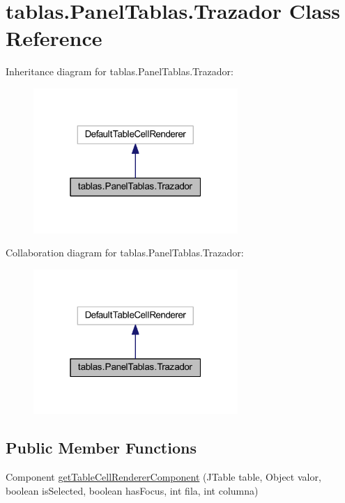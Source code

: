 \hypertarget{classtablas_1_1_panel_tablas_1_1_trazador}{}\section{tablas.\+Panel\+Tablas.\+Trazador Class Reference}
\label{classtablas_1_1_panel_tablas_1_1_trazador}


Inheritance diagram for tablas.\+Panel\+Tablas.\+Trazador\+:
\nopagebreak
\begin{figure}[H]
\begin{center}
\leavevmode
\includegraphics[width=220pt]{classtablas_1_1_panel_tablas_1_1_trazador__inherit__graph}
\end{center}
\end{figure}


Collaboration diagram for tablas.\+Panel\+Tablas.\+Trazador\+:
\nopagebreak
\begin{figure}[H]
\begin{center}
\leavevmode
\includegraphics[width=220pt]{classtablas_1_1_panel_tablas_1_1_trazador__coll__graph}
\end{center}
\end{figure}
\subsection*{Public Member Functions}
\begin{DoxyCompactItemize}
\item 
Component \mbox{\hyperlink{classtablas_1_1_panel_tablas_1_1_trazador_acec33235cbf2fb884f8b2de3400ab6f8}{get\+Table\+Cell\+Renderer\+Component}} (J\+Table table, Object valor, boolean is\+Selected, boolean has\+Focus, int fila, int columna)
\end{DoxyCompactItemize}


